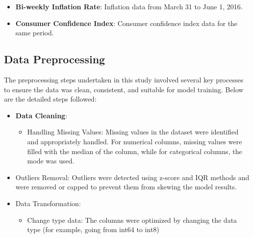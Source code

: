 \documentclass[letterpaper, 10 pt, conference]{ieeeconf}  %
\begin{document}
\begin{itemize}
        \item \textbf{Bi-weekly Inflation Rate}: Inflation data from March 31 to June 1, 2016.
        \item \textbf{Consumer Confidence Index}: Consumer confidence index data for the same period.
\end{itemize}

\subsection{Data Preprocessing}
The preprocessing steps undertaken in this study involved several key processes to ensure the data was clean, consistent, and suitable for model training. Below are the detailed steps followed:
\begin{itemize}                
        \item \textbf{Data Cleaning}: 
        \begin{itemize}
                \item Handling Missing Values: Missing values in the dataset were identified and appropriately handled. For numerical columns, missing values were filled with the median of the column, while for categorical columns, the mode was used.        
        \end{itemize}
        \item Outliers Removal: Outliers were detected using z-score and IQR methods and were removed or capped to prevent them from skewing the model results.
        
        \item Data Transformation:
        \begin{itemize}
                \item Change type data: The columns were optimized by changing the data type (for example, going from int64 to int8)
        \end{itemize}
        

\end{itemize}
\end{document}
